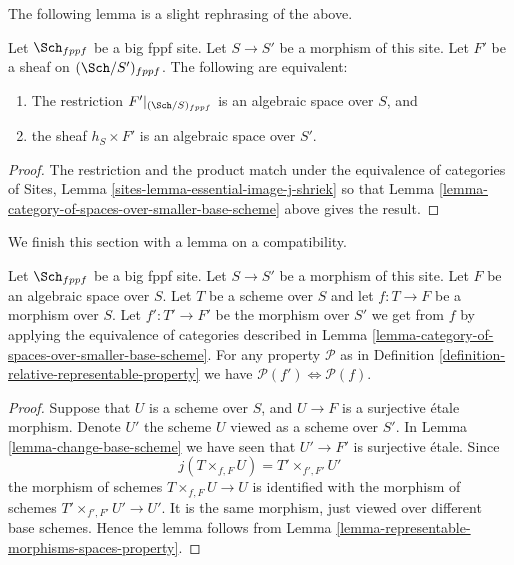 \noindent
The following lemma is a slight rephrasing of the above.

\begin{lemma}
\label{lemma-rephrase}
Let $\Sch_{fppf}$ be a big fppf site.
Let $S \to S'$ be a morphism of this site.
Let $F'$ be a sheaf on $(\Sch/S')_{fppf}$.
The following are equivalent:
\begin{enumerate}
\item The restriction $F'|_{(\Sch/S)_{fppf}}$
is an algebraic space over $S$, and
\item the sheaf $h_S \times F'$ is an algebraic space over $S'$.
\end{enumerate}
\end{lemma}

\begin{proof}
The restriction and the product match under
the equivalence of categories of
Sites, Lemma \ref{sites-lemma-essential-image-j-shriek}
so that
Lemma \ref{lemma-category-of-spaces-over-smaller-base-scheme}
above gives the result.
\end{proof}

\noindent
We finish this section with a lemma on a compatibility.

\begin{lemma}
\label{lemma-viewed-as-properties}
Let $\Sch_{fppf}$ be a big fppf site.
Let $S \to S'$ be a morphism of this site.
Let $F$ be an algebraic space over $S$.
Let $T$ be a scheme over $S$ and let $f : T \to F$ be
a morphism over $S$.
Let $f' : T' \to F'$ be the morphism over $S'$ we get from
$f$ by applying the equivalence of categories described in
Lemma \ref{lemma-category-of-spaces-over-smaller-base-scheme}.
For any property $\mathcal{P}$ as in
Definition \ref{definition-relative-representable-property}
we have $\mathcal{P}(f') \Leftrightarrow \mathcal{P}(f)$.
\end{lemma}

\begin{proof}
Suppose that $U$ is a scheme over $S$, and $U \to F$ is a surjective \'etale
morphism. Denote $U'$ the scheme $U$ viewed as a scheme over $S'$. In
Lemma \ref{lemma-change-base-scheme}
we have seen that $U' \to F'$ is surjective \'etale. Since
$$
j(T \times_{f, F} U) = T' \times_{f', F'} U'
$$
the morphism of schemes $T \times_{f, F} U \to U$
is identified with the morphism of schemes
$T' \times_{f', F'} U' \to U'$.
It is the same morphism, just viewed over different base schemes.
Hence the lemma follows from
Lemma \ref{lemma-representable-morphisms-spaces-property}.
\end{proof}

















